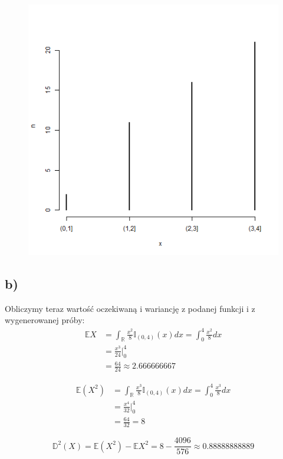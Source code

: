 \documentclass{article}
\begin{document}
\begin{figure}[h!]
\begin{center}
\includegraphics[height = 0.5\textheight, angle = 0]{"lab7zad5.png"}
\end{center}
\end{figure}

\subsection{b)}
Obliczymy teraz wartość oczekiwaną i wariancję z podanej funkcji i z wygenerowanej próby:
\begin{align*}
\mathbb{E}X & = \int_\mathbb{R} \frac{x^2}{8}\mathbb{I}_{(0,4)}(x) dx = \int_0^4 \frac{x^2}{8} dx \\
& = \frac{x^3}{24} \Big\vert_0^4 \\
& = \frac{64}{24} \approx 2.666666667
\end{align*}

\begin{align*}
\mathbb{E}(X^2) & = \int_\mathbb{R} \frac{x^3}{8}\mathbb{I}_{(0,4)}(x) dx = \int_0^4 \frac{x^3}{8} dx \\
& = \frac{x^4}{32} \Big\vert_0^4 \\
& = \frac{64}{32} = 8
\end{align*}

\[ \mathbb{D}^2(X) = \mathbb{E}(X^2) - \mathbb{E}X^2 = 8 - \frac{4096}{576} \approx 0.88888888889 \]
\end{document}
